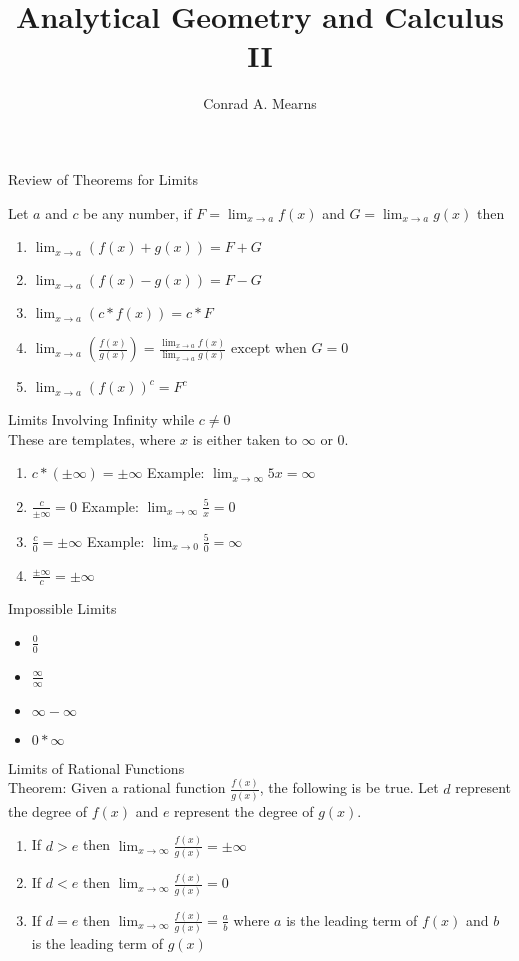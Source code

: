 \documentclass{article}
\title{Analytical Geometry and Calculus II}
\author{Conrad A. Mearns}
\begin{document}
\maketitle

\noindent
\Large
Review of Theorems for Limits\\
\normalsize

\noindent
Let $a$ and $c$ be any number, if $F = \lim_{x \to a}f(x)$ and $G = \lim_{x \to a}g(x)$ then

\begin{enumerate}
  \item $\lim_{x \to a}(f(x) + g(x)) = F + G$
  \item $\lim_{x \to a}(f(x) - g(x)) = F - G$
  \item $\lim_{x \to a}(c * f(x)) = c * F$
  \item $\lim_{x \to a}(\frac{f(x)}{g(x)}) = \frac{\lim_{x \to a}f(x)}{\lim_{x \to a}g(x)}$ except when $G = 0$
  \item $\lim_{x \to a}(f(x))^c = F^c$
\end{enumerate}

\noindent
\Large
Limits Involving Infinity while $c \neq 0$\\
\normalsize
\noindent
These are templates, where $x$ is either taken to $\infty$ or 0.

\begin{enumerate}
  \item $c * (\pm \infty) = \pm \infty$ Example: $\lim_{x \to \infty}5x = \infty$
  \item $\frac{c}{\pm \infty} = 0$ Example: $\lim_{x \to \infty}\frac{5}{x} = 0$
  \item $\frac{c}{0} = \pm \infty$ Example: $\lim_{x \to 0}\frac{5}{0} = \infty$
  \item $\frac{\pm \infty}{c} = \pm \infty$
\end{enumerate}

\noindent
\Large
Impossible Limits
\normalsize
\noindent
\begin{itemize}
  \item $\frac{0}{0}$
  \item $\frac{\infty}{\infty}$
  \item $\infty - \infty$
  \item $0 * \infty$
\end{itemize}

\noindent
\Large
Limits of Rational Functions\\
\normalsize
\noindent
Theorem: Given a rational function $\frac{f(x)}{g(x)}$, the following is be true.
Let $d$ represent the degree of $f(x)$ and $e$ represent the degree of $g(x)$.\\
\begin{enumerate}
  \item If $d > e$ then $\lim_{x \to \infty}\frac{f(x)}{g(x)} = \pm \infty$
  \item If $d < e$ then $\lim_{x \to \infty}\frac{f(x)}{g(x)} = 0$
  \item If $d = e$ then $\lim_{x \to \infty}\frac{f(x)}{g(x)} = \frac{a}{b}$ where $a$ is the leading term of $f(x)$ and $b$ is the leading term of $g(x)$
\end{enumerate}
\end{document}
